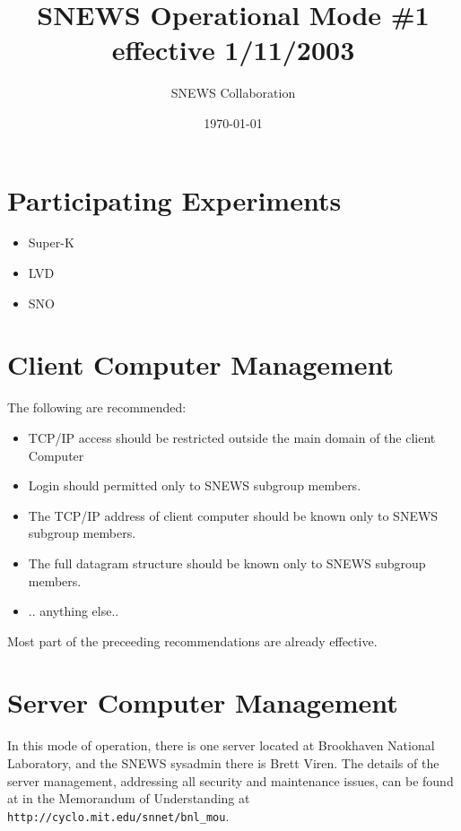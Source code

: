 \documentclass{article}
\begin{document}
\title{SNEWS Operational Mode \#1 effective 1/11/2003}         
\author{SNEWS Collaboration}
\date{\today}
\maketitle

\section{Participating Experiments}

\begin{itemize}
\item Super-K
\item LVD
\item SNO
\end{itemize}

\section{Client Computer Management}

The following are recommended:

\begin{itemize}
\item TCP/IP access should be restricted outside the main domain of the client Computer
\item Login should permitted only to SNEWS subgroup members.
\item The TCP/IP address of client computer should be known only to SNEWS subgroup members.
\item The full datagram structure should be known only to SNEWS subgroup members.
\item .. anything else..
\end{itemize}
Most part of the preceeding recommendations are already effective.

\section{Server Computer Management}

In this mode of operation, there is one server located at Brookhaven
National Laboratory, and the SNEWS sysadmin there is Brett Viren.
The details of the server management, addressing all
security and maintenance issues, can be found at
in the Memorandum of Understanding at
\texttt{http://cyclo.mit.edu/snnet/bnl_mou}.
\end{document}
